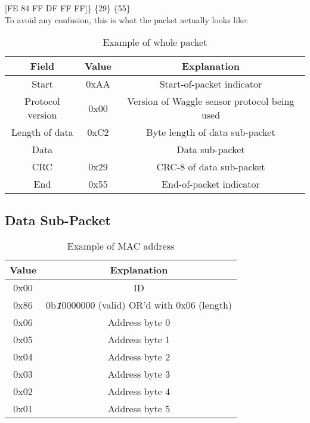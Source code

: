 \hspace{0.25em} [FE 84 FF DF FF FF]\} \hspace{0.25em} \{29\} \hspace{0.25em} \{55\}\\

To avoid any confusion, this is what the packet actually looks like:\\


\begin{table}[H]
    \centering
    {
    \begin{tabular}{|c c c|}
        \hline
        \textbf{Field} & \textbf{Value} & \textbf{Explanation}\\
        \hline
        \hline
        Start & 0xAA & Start-of-packet indicator\\
        Protocol version & 0x00 & Version of Waggle sensor protocol being used\\
        Length of data & 0xC2 & Byte length of data sub-packet\\
        Data & & Data sub-packet\\
        CRC & 0x29 & CRC-8 of data sub-packet\\
        End & 0x55 & End-of-packet indicator\\
        \hline
    \end{tabular}
    }
    \caption{Example of whole packet}
\end{table}


\subsection{Data Sub-Packet}

\begin{table}[H]
    \centering
    {
    \begin{tabular}{|c c|}
        \hline
        \textbf{Value} & \textbf{Explanation}\\
        \hline
        \hline
        0x00 & ID\\
        0x86 & 0b\textbf{\textit{1}}0000000 (valid) OR'd with 0x06 (length)\\
        0x06 & Address byte 0\\
        0x05 & Address byte 1\\
        0x04 & Address byte 2\\
        0x03 & Address byte 3\\
        0x02 & Address byte 4\\
        0x01 & Address byte 5\\
        \hline
    \end{tabular}
    }
    \caption{Example of MAC address}
\end{table}

